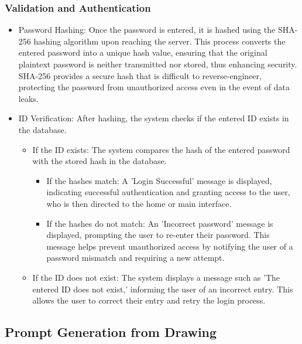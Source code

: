 \documentclass[conference]{IEEEtran}
\begin{document}
\subsubsection{Validation and Authentication}
\begin{itemize}
    \item Password Hashing: Once the password is entered, it is hashed using the SHA-256 hashing algorithm upon reaching the server. This process converts the entered password into a unique hash value, ensuring that the original plaintext password is neither transmitted nor stored, thus enhancing security. SHA-256 provides a secure hash that is difficult to reverse-engineer, protecting the password from unauthorized access even in the event of data leaks.\\
    \item ID Verification: After hashing, the system checks if the entered ID exists in the database.
    \begin{itemize}
        \item If the ID exists: The system compares the hash of the entered password with the stored hash in the database.
        \begin{itemize}
            \item If the hashes match: A 'Login Successful' message is displayed, indicating successful authentication and granting access to the user, who is then directed to the home or main interface.\\
            \item If the hashes do not match: An 'Incorrect password' message is displayed, prompting the user to re-enter their password. This message helps prevent unauthorized access by notifying the user of a password mismatch and requiring a new attempt.\\
        \end{itemize}
        \item If the ID does not exist: The system displays a message such as 'The entered ID does not exist,' informing the user of an incorrect entry. This allows the user to correct their entry and retry the login process.\\
    \end{itemize}
\end{itemize}

\subsection{Prompt Generation from Drawing }
\end{document}
